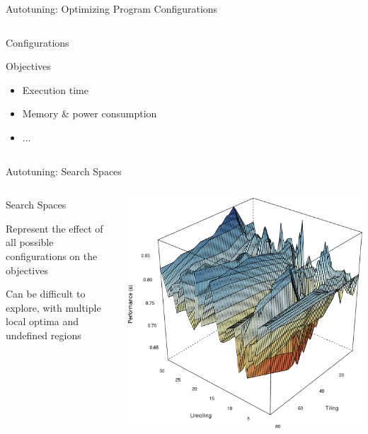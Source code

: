 \documentclass[10pt, compress, aspectratio=169, xcolor={table,usenames,dvipsnames}]{beamer}
\begin{document}
\begin{frame}[label={sec:orgaa600d4},fragile]{Autotuning: Optimizing Program Configurations}
\begin{columns}
\begin{column}{0.5\columnwidth}
\begin{block}{Configurations}
\begin{itemize}
\vspace{-.2cm}
\end{itemize}

\begin{block}{Objectives}
\begin{itemize}
\item Execution time
\item Memory \& power consumption
\item \(\dots\)
\end{itemize}
\end{block}
\end{block}
\end{column}
\end{columns}
\end{frame}

\begin{frame}[label={sec:org38c2757}]{Autotuning: Search Spaces}
\begin{columns}
\begin{column}{0.4\columnwidth}
\begin{block}{Search Spaces}
\vspace{.2cm}

Represent the \alert{effect} of all possible
configurations on the objectives

Can be difficult to explore, with multiple \alert{local optima}
and \alert{undefined regions}
\end{block}
\end{column}

\begin{column}{0.6\columnwidth}
\begin{center}
\begin{center}
\includegraphics[width=.8\columnwidth]{../../../img/bicgkernel_averaged_search_space_edited.pdf}
\end{center}


\end{center}
\end{column}
\end{columns}
\end{frame}
\end{document}
